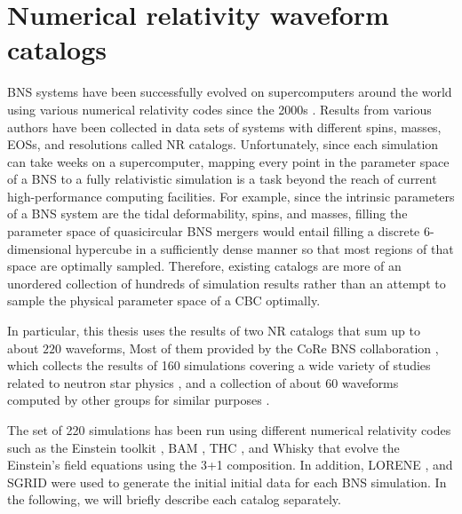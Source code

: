 \newpage
\section{Numerical relativity waveform catalogs}\label{NR}

BNS systems have been successfully evolved on supercomputers around the world using various numerical relativity codes since the 2000s \cite{Shibata:1999hn,Shibata:1999wm,Shibata:2019wef}. Results from various authors have been collected in data sets of systems with different spins, masses, EOSs, and resolutions called NR catalogs. Unfortunately, since each simulation can take weeks on a supercomputer, mapping every point in the parameter space of a BNS to a fully relativistic simulation is a task beyond the reach of current high-performance computing facilities. For example, since the intrinsic parameters of a BNS system are the tidal deformability, spins, and masses, filling the parameter space of quasicircular BNS mergers would entail filling a discrete 6-dimensional hypercube in a sufficiently dense manner so that most regions of that space are optimally sampled. Therefore, existing catalogs are more of an unordered collection of hundreds of simulation results rather than an attempt to sample the physical parameter space of a CBC optimally. 


In particular, this thesis uses the results of two NR catalogs that sum up to about $220$ waveforms, Most of them provided by the CoRe BNS collaboration \cite{Dietrich:2018phi}, which collects the results of 160 simulations covering a wide variety of studies related to neutron star physics \cite{Bernuzzi:2014kca,Dietrich:2016hky,Bernuzzi:2016pie,Dietrich:2017aum, Dietrich:2016lyp,Dietrich:2015pxa,Dietrich:2017xqb,Radice:2017zta,Bernuzzi:2014owa,Dietrich:2015iva,Bernuzzi:2015rla, Radice:2016gym,Radice:2016rys,Radice:2017lry,Dietrich:2017feu, Zappa:2017xba}, and a collection of about 60 waveforms computed by other groups for similar purposes \cite{Maione:2016zqz, Kastaun:2016elu,Maione:2017aux,Ciolfi:2017uak,Feo:2016cbs, Kawamura:2016nmk,DePietri:2015lya,DePietri:2018tpx}.

The set of 220 simulations has been run using different numerical relativity codes such as the Einstein toolkit \cite{Loffler:2011ay,Mosta:2013gwu}, BAM \cite{PhysRevLett.92.211101,PhysRevD.77.024027,Thierfelder:2011yi}, THC \cite{Radice_2012}, and Whisky \cite{Baiotti:2003btu,Giacomazzo:2007ti} that evolve the Einstein's field equations using the 3+1 composition. In addition, LORENE \cite{lorene}, and SGRID \cite{Tichy_2009,Tichy_2012,Dietrich_2015} were used to generate the initial initial data for each BNS simulation. In the following, we will briefly describe each catalog separately.


